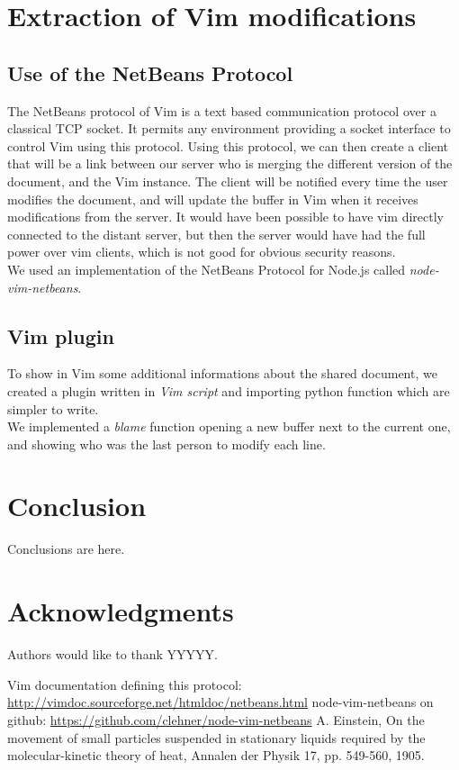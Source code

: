 \documentclass{llncs}
\begin{document}
\section{Extraction of Vim modifications}\label{sec:Others}

\subsection{Use of the NetBeans Protocol}

The NetBeans protocol of Vim is a text based communication protocol over a
classical TCP socket.
It permits any environment providing a socket interface to control Vim using
this protocol.\cite{netbeans} Using this protocol, we can then create a client
that will be a link between our server who is merging the different version of
the document, and the Vim instance.
The client will be notified every time the user modifies the document, and will
update the buffer in Vim when it receives modifications from the server.
It would have been possible to have vim directly connected to the distant
server, but then the server would have had the full power over vim clients,
which is not good for obvious security reasons.\\
We used an implementation of the NetBeans Protocol for Node.js called
\textit{node-vim-netbeans}.\cite{node-vim-netbeans}

\subsection{Vim plugin}

To show in Vim some additional informations about the shared document, we
created a plugin written in \textit{Vim script} and importing python function
which are simpler to write.\\
We implemented a \textit{blame} function opening a new buffer next to the
current one, and showing who was the last person to modify each line.

\section{Conclusion}\label{sec:Conclusion}

Conclusions are here.

\section*{Acknowledgments}\label{sec:Acknowledgments}

Authors would like to thank YYYYY.

\begin{thebibliography}{1}

Vim documentation defining this protocol: \url{http://vimdoc.sourceforge.net/htmldoc/netbeans.html}
node-vim-netbeans on github: \url{https://github.com/clehner/node-vim-netbeans}
A. Einstein, On the movement of small particles suspended in stationary liquids required by the molecular-kinetic theory of heat, Annalen der Physik 17, pp. 549-560, 1905.

\end{thebibliography}
\end{document}
